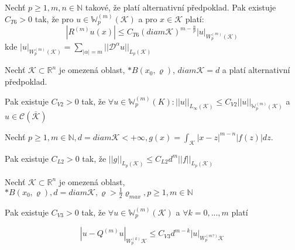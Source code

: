 \documentclass[../main.tex]{subfiles}
\begin{document}
\begin{claim}[T6]
    Nechť $p\geq1, m,n\in\mathbb{N}$ takové, že platí alternativní předpoklad. Pak existuje $C_{T6} > 0$ tak, že pro 
    $u\in \mathbb{W}_p^{(m)}(\mathcal{K})$ a pro $x\in\mathcal{K}$ platí:
    \begin{equation*}
        \left| R^{(m)} u(x) \right| \leq C_{T6} (diam \mathcal{K})^{m-\frac{n}{p}} |u|_{W_p^{(m)}(\mathcal{K})}
    \end{equation*}
    kde $|u|_{W^{(m)}_p (\mathcal{K})} = \sum_{|\alpha| =  m} ||\mathcal{D}^\alpha u || _{L_p (\mathcal{K})}$
\end{claim}


\begin{theorem}
    Nechť $\mathcal{K} \subset \mathbb{R}^n$ je omezená oblast, $*B(x_0, \varrho)$, $diam \mathcal{K} = d$ a platí alternativní předpoklad.

    Pak existuje $C_{V2} > 0$ tak, že $\forall u \in \mathbb{W}_p^{(m)} (K) : ||u||_{L_\infty(\mathcal{K})} \leq C_{V2} ||u||_{\mathbb{W}_p^{(m)}(\mathcal{K})} $ a $u\in\mathcal{C}(\bar{\mathcal{K}})$
    
\end{theorem}



\begin{lemma}
    Nechť $p\geq 1, m\in\mathbb{N}, d = diam \mathcal{K} < +\infty, g(x) = \int_\mathcal{K} |x-z|^{m-n} |f(z)| dz$.\

    Pak existuje $C_{L2} > 0$ tak, že $||g||_{L_p(\mathcal{K})} \leq C_{L2} d^m ||f||_{L_p(\mathcal{K})}$
\end{lemma}


\begin{theorem}
    Nechť $\mathcal{K}\subset\mathbb{R}^n$ je omezená oblast, $*B(x_0,\varrho), d=diam\mathcal{K}, \varrho > \frac{1}{2} \varrho_{max}, p\geq 1, m\in \mathbb{N} $
    
    Pak existuje $C_{V3} > 0$ tak, že $\forall u \in \mathbb{W}_p^{(m)}(\mathcal{K})$ a $\forall k = 0,...,m$ platí

    \begin{equation*}
        \left|  u-Q^{(m)}u     \right|_{W_p^{(k)}\mathcal{K}} \leq C_{V3} d^{m-k} |u|_{W_p^{(m ?)}\mathcal{K}} 
    \end{equation*}

\end{theorem}
\end{document}

